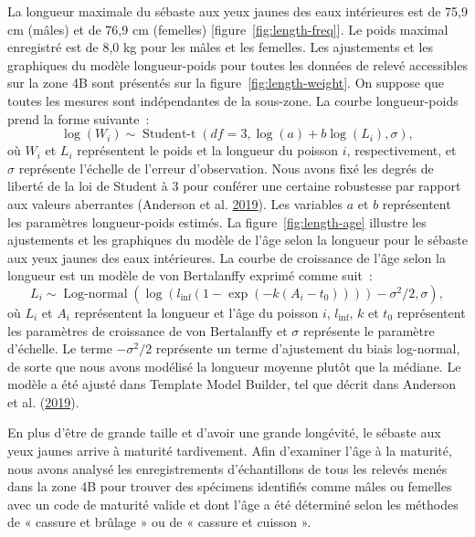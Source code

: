 \documentclass[11pt]{book}
\begin{document}
La longueur maximale du sébaste aux yeux jaunes des eaux intérieures est de 75,9 cm (mâles) et de 76,9 cm (femelles) {[}figure~\ref{fig:length-freq}{]}. Le poids maximal enregistré est de 8,0 kg pour les mâles et les femelles. Les ajustements et les graphiques du modèle longueur-poids pour toutes les données de relevé accessibles sur la zone 4B sont présentés sur la figure~\ref{fig:length-weight}. On suppose que toutes les mesures sont indépendantes de la sous-zone. La courbe longueur-poids prend la forme suivante~:
\begin{equation}
\log (W_i) \sim \operatorname{Student-t}(df = 3, \log(a) + b \log(L_i), \sigma),
\end{equation}
où \(W_i\) et \(L_i\) représentent le poids et la longueur du poisson \(i\), respectivement, et \(\sigma\) représente l'échelle de l'erreur d'observation. Nous avons fixé les degrés de liberté de la loi de Student à 3 pour conférer une certaine robustesse par rapport aux valeurs aberrantes (Anderson et al. \protect\hyperlink{ref-anderson2019synopsis}{2019}). Les variables \(a\) et \(b\) représentent les paramètres longueur-poids estimés. La figure~\ref{fig:length-age} illustre les ajustements et les graphiques du modèle de l'âge selon la longueur pour le sébaste aux yeux jaunes des eaux intérieures. La courbe de croissance de l'âge selon la longueur est un modèle de von Bertalanffy exprimé comme suit~:
\begin{equation}
L_i \sim \operatorname{Log-normal}
\left( \log(l_\mathrm{inf} (1 - \exp(-k (A_i - t_0)))) -
\sigma^2 / 2, \sigma \right),
\end{equation}
où \(L_i\) et \(A_i\) représentent la longueur et l'âge du poisson \(i\), \(l_\mathrm{inf}\), \(k\) et \(t_0\) représentent les paramètres de croissance de von Bertalanffy et \(\sigma\) représente le paramètre d'échelle. Le terme \(- \sigma^2 /2\) représente un terme d'ajustement du biais log-normal, de sorte que nous avons modélisé la longueur moyenne plutôt que la médiane. Le modèle a été ajusté dans Template Model Builder, tel que décrit dans Anderson et al. (\protect\hyperlink{ref-anderson2019synopsis}{2019}).

\hypertarget{sec:maturity}{%
\label{sec:maturity}}

En plus d'être de grande taille et d'avoir une grande longévité, le sébaste aux yeux jaunes arrive à maturité tardivement. Afin d'examiner l'âge à la maturité, nous avons analysé les enregistrements d'échantillons de tous les relevés menés dans la zone 4B pour trouver des spécimens identifiés comme mâles ou femelles avec un code de maturité valide et dont l'âge a été déterminé selon les méthodes de « cassure et brûlage » ou de « cassure et cuisson ».
\end{document}
